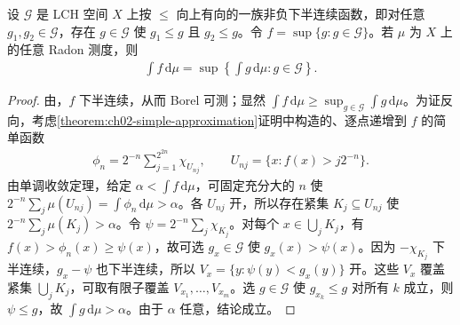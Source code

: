 \documentclass[../../main.tex]{subfiles}
\begin{document}
\begin{proposition}\label{proposition:ch07-directed-lsc-convergence}
设 $\mathscr G$ 是 LCH 空间 $X$ 上按 $\leqslant$ 向上有向的一族非负下半连续函数，即对任意 $g_1,g_2\in\mathscr G$，存在 $g\in\mathscr G$ 使 $g_1\leqslant g$ 且 $g_2\leqslant g$。令 $f=\sup\{g:g\in\mathscr G\}$。若 $\mu$ 为 $X$ 上的任意 Radon 测度，则
\begin{align*}
\int f\,\mathrm d\mu=\sup\left\{\int g\,\mathrm d\mu:g\in\mathscr G\right\}.
\end{align*}
\end{proposition}
\begin{proof}
由，$f$ 下半连续，从而 Borel 可测；显然 $\int f\,\mathrm d\mu\geqslant\sup_{g\in\mathscr G}\int g\,\mathrm d\mu$。为证反向，考虑\cref{theorem:ch02-simple-approximation}证明中构造的、逐点递增到 $f$ 的简单函数
\begin{align*}
\phi_n=2^{-n}\sum_{j=1}^{2^{2n}}\chi_{U_{nj}},\qquad U_{nj}=\{x:f(x)>j2^{-n}\}.
\end{align*}
由单调收敛定理，给定 $\alpha<\int f\,\mathrm d\mu$，可固定充分大的 $n$ 使 $2^{-n}\sum_j\mu(U_{nj})=\int\phi_n\,\mathrm d\mu>\alpha$。各 $U_{nj}$ 开，所以存在紧集 $K_j\subseteq U_{nj}$ 使 $2^{-n}\sum_j\mu(K_j)>\alpha$。令 $\psi=2^{-n}\sum_j\chi_{K_j}$。对每个 $x\in\bigcup_jK_j$，有 $f(x)>\phi_n(x)\geqslant\psi(x)$，故可选 $g_x\in\mathscr G$ 使 $g_x(x)>\psi(x)$。因为 $-\chi_{K_j}$ 下半连续，$g_x-\psi$ 也下半连续，所以 $V_x=\{y:\psi(y)<g_x(y)\}$ 开。这些 $V_x$ 覆盖紧集 $\bigcup_jK_j$，可取有限子覆盖 $V_{x_1},\ldots,V_{x_m}$。选 $g\in\mathscr G$ 使 $g_{x_k}\leqslant g$ 对所有 $k$ 成立，则 $\psi\leqslant g$，故 $\int g\,\mathrm d\mu>\alpha$。由于 $\alpha$ 任意，结论成立。
\end{proof}
\end{document}
